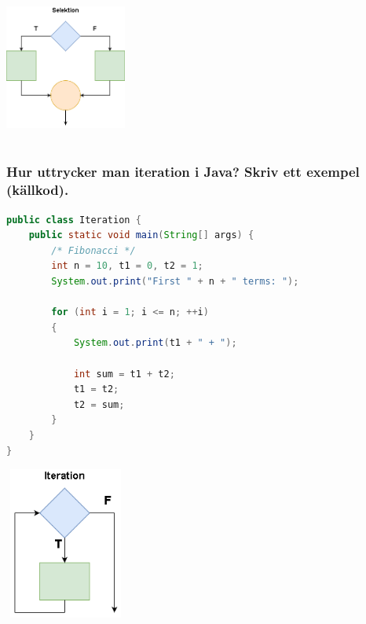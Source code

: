 \documentclass[../main.tex]{subfiles}
\begin{document}
\includegraphics[width=4cm, height=5cm]{sec1/Figs/selektion.png}

\newpage

\subsubsection{Hur uttrycker man iteration i Java? Skriv ett exempel (källkod).}
\begin{lstlisting}[language=java]
public class Iteration {
    public static void main(String[] args) {
        /* Fibonacci */
        int n = 10, t1 = 0, t2 = 1;
        System.out.print("First " + n + " terms: ");

        for (int i = 1; i <= n; ++i)
        {
            System.out.print(t1 + " + ");

            int sum = t1 + t2;
            t1 = t2;
            t2 = sum;
        }
    }
}
\end{lstlisting}

\includegraphics[width=4cm, height=5cm]{sec1/Figs/iteration.png}
\end{document}

